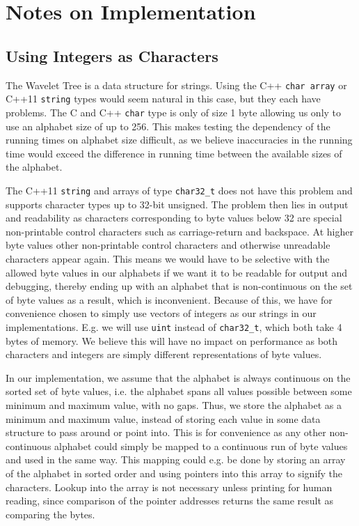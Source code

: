 \section{Notes on Implementation}

\subsection{Using Integers as Characters}
\label{sec:UsingIntAsChar}
The Wavelet Tree is a data structure for strings. 
Using the C++ \texttt{char array} or C++11 \texttt{string} types would seem natural in this case, but they each have problems.
The C and C++ \texttt{char} type is only of size 1 byte allowing us only to use an alphabet size of up to 256.
This makes testing the dependency of the running times on alphabet size difficult, as we believe inaccuracies in the running time would exceed the difference in running time between the available sizes of the alphabet.

The C++11 \texttt{string} and arrays of type \texttt{char32\_t} does not have this problem and supports character types up to 32-bit unsigned. 
The problem then lies in output and readability as characters corresponding to byte values below 32 are special non-printable control characters such as carriage-return and backspace. 
At higher byte values other non-printable control characters and otherwise unreadable characters appear again. This means we would have to be selective with the allowed byte values in our alphabets if we want it to be readable for output and debugging, thereby ending up with an alphabet that is non-continuous on the set of byte values as a result, which is inconvenient.
Because of this, we have for convenience chosen to simply use vectors of integers as our strings in our implementations.
E.g. we will use \texttt{uint} instead of \texttt{char32\_t}, which both take 4 bytes of memory.
We believe this will have no impact on performance as both characters and integers are simply different representations of byte values.

In our implementation, we assume that the alphabet is always continuous on the sorted set of byte values, i.e. the alphabet spans all values possible between some minimum and maximum value, with no gaps.
Thus, we store the alphabet as a minimum and maximum value, instead of storing each value in some data structure to pass around or point into.
This is for convenience as any other non-continuous alphabet could simply be mapped to a continuous run of byte values and used in the same way. 
This mapping could e.g. be done by storing an array of the alphabet in sorted order and using pointers into this array to signify the characters. 
Lookup into the array is not necessary unless printing for human reading, since comparison of the pointer addresses returns the same result as comparing the bytes.

